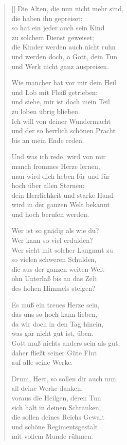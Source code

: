 \begin{multicols}{2}
\begin{verse}[\versewidth]
 Die Alten, die nun nicht mehr sind,\\
die haben ihn gepreiset;\\
so hat ein jeder auch sein Kind\\
zu solchem Dienst geweiset;\\
die Kinder werden auch nicht ruhn\\
und werden doch, o Gott, dein Tun\\
und Werk nicht ganz auspreisen.

 Wie mancher hat vor mir dein Heil\\
und Lob mit Fleiß getrieben;\\
und siehe, mir ist doch mein Teil\\
zu loben übrig blieben.\\
Ich will von deiner Wundermacht\\
und der so herrlich schönen Pracht\\
bis an mein Ende reden.

 Und was ich rede, wird von mir\\
manch frommes Herze lernen,\\
man wird dich heben für und für\\
hoch über allen Sternen;\\
dein Herrlichkeit und starke Hand\\
wird in der ganzen Welt bekannt\\
und hoch berufen werden.

 Wer ist so gnädig als wie du?\\
Wer kann so viel erdulden?\\
Wer sieht mit solcher Langmut zu\\
so vielen schweren Schulden,\\
die aus der ganzen weiten Welt\\
ohn Unterlaß bis an das Zelt\\
des hohen Himmels steigen?

 Es muß ein treues Herze sein,\\
das uns so hoch kann lieben,\\
da wir doch in den Tag hinein,\\
was gar nicht gut ist, üben.\\
Gott muß nichts anders sein als gut,\\
daher fließt seiner Güte Flut\\
auf alle seine Werke.

 Drum, Herr, so sollen dir auch nun\\
all deine Werke danken,\\
voraus die Heilgen, deren Tun\\
sich hält in deinen Schranken,\\
die sollen deines Reichs Gewalt\\
und schöne Regimentsgestalt\\
mit vollem Munde rühmen.


\end{verse}
\end{multicols}
